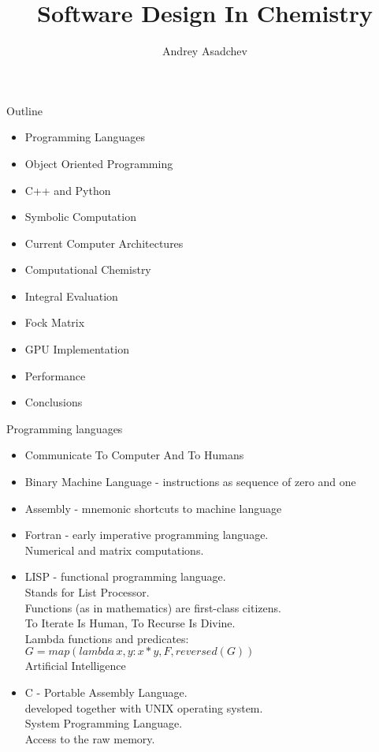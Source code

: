 \documentclass{beamer}
\title[ Software Design In Computational Sciences]{Software Design In Chemistry}
\author{ Andrey Asadchev}
\institute{Iowa State University}
\begin{document}
\begin{frame}
\titlepage
\end{frame}


\begin{frame}{Outline}
\begin{itemize}
\item Programming Languages
\item Object Oriented Programming
\item C++ and Python
\item Symbolic Computation
\item Current Computer Architectures
\item Computational Chemistry
\item Integral Evaluation
\item Fock Matrix
\item GPU Implementation
\item Performance
\item Conclusions
\end{itemize}
\end{frame}

\begin{frame}{Programming languages}
\begin{itemize}
\item Communicate To Computer And To Humans
\item Binary Machine Language - instructions as sequence of zero and one
\item Assembly - mnemonic shortcuts to machine language
\item Fortran - early imperative programming language.\\
  Numerical and matrix computations.
\item LISP - functional programming language.\\
   Stands for List Processor.\\
   Functions (as in mathematics) are first-class citizens.\\
   To Iterate Is Human, To Recurse Is Divine.\\
   Lambda functions and predicates: $G = map(lambda\, x,y: x*y, F,reversed(G))$\\
   Artificial Intelligence\\
\item C - Portable Assembly Language.\\
  developed together with UNIX operating system.\\
  System Programming Language.\\
  Access to the raw memory.
\end{itemize}
\end{frame}
\end{document}
